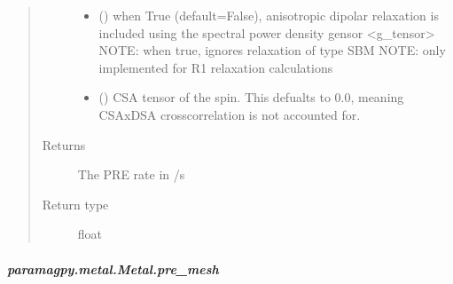 \documentclass[a4paper,10pt,english,openany,oneside]{sphinxmanual}
\begin{document}
\begin{fulllineitems}
\begin{fulllineitems}
\begin{fulllineitems}
\begin{quote}
\begin{description}
\begin{itemize}
\item {} 
 (\sphinxstyleliteralemphasis{\sphinxupquote{ (}}\sphinxstyleliteralemphasis{\sphinxupquote{)}}) \textendash{} when True (default=False), anisotropic dipolar relaxation is
included using the spectral power density gensor \textless{}g\_tensor\textgreater{}
NOTE: when true, ignores relaxation of type SBM
NOTE: only implemented for R1 relaxation calculations

\item {} 
 (\sphinxstyleliteralemphasis{\sphinxupquote{ (}}\sphinxstyleliteralemphasis{\sphinxupquote{,}}\sphinxstyleliteralemphasis{\sphinxupquote{) }}\sphinxstyleliteralemphasis{\sphinxupquote{(}}\sphinxstyleliteralemphasis{\sphinxupquote{)}}) \textendash{} CSA tensor of the spin.
This defualts to 0.0, meaning CSAxDSA crosscorrelation is
not accounted for.

\end{itemize}

\item[{Returns}] \leavevmode
{} \textendash{} The PRE rate in /s

\item[{Return type}] \leavevmode
float

\end{description}\end{quote}

\end{fulllineitems}



\subparagraph{paramagpy.metal.Metal.pre\_mesh}
\label{\detokenize{reference/generated/paramagpy.metal.Metal.pre_mesh:paramagpy-metal-metal-pre-mesh}}\label{\detokenize{reference/generated/paramagpy.metal.Metal.pre_mesh::doc}}


\end{fulllineitems}
\end{fulllineitems}
\end{document}
